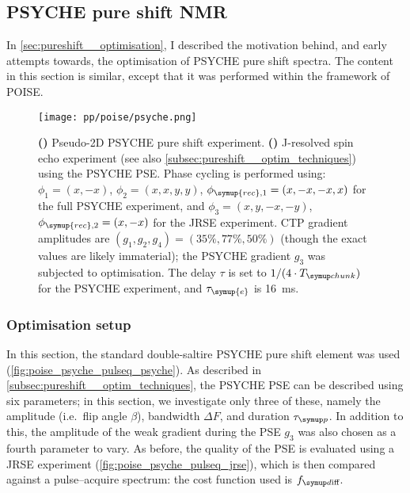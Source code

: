 \subsection{PSYCHE pure shift NMR}
\label{subsec:poise__psyche}

In \cref{sec:pureshift__optimisation}, I described the motivation behind, and early attempts towards, the optimisation of PSYCHE pure shift spectra.
The content in this section is similar, except that it was performed within the framework of POISE.

\begin{figure}[htb]
    \centering
    \texttt{[image: pp/poise/psyche.png]}%
    {\label{fig:poise_psyche_pulseq_psyche}}%
    {\label{fig:poise_psyche_pulseq_jrse}}%
    \caption[Pulse sequences used for PSYCHE optimisations]{
        \textbf{()} Pseudo-2D PSYCHE pure shift experiment.
        \textbf{()} J-resolved spin echo experiment (see also \cref{subsec:pureshift__optim_techniques}) using the PSYCHE PSE.
        Phase cycling is performed using: $\phi_1 = (x, -x)$, $\phi_2 = (x, x, y, y)$, $\phi_{\symup{rec},1} = (x, -x, -x, x)$ for the full PSYCHE experiment, and $\phi_3 = (x, y, -x, -y)$, $\phi_{\symup{rec},2} = (x, -x)$ for the JRSE experiment.
        CTP gradient amplitudes are $(g_1, g_2, g_4) = (35\%, 77\%, 50\%)$ (though the exact values are likely immaterial); the PSYCHE gradient $g_3$ was subjected to optimisation.
        The delay $\tau$ is set to $1/(4 \cdot \Tchunk)$ for the PSYCHE experiment, and $\tau_{\symup{e}}$ is \qty{16}{\ms}.
    }
    \label{fig:poise_psyche_pulseq}
\end{figure}



\subsubsection{Optimisation setup}

In this section, the standard double-saltire PSYCHE pure shift element was used (\cref{fig:poise_psyche_pulseq_psyche}).\autocite{Foroozandeh2014ACIE,Foroozandeh2018CEJ}
As described in \cref{subsec:pureshift__optim_techniques}, the PSYCHE PSE can be described using six parameters; in this section, we investigate only three of these, namely the amplitude (i.e.\ flip angle $\beta$), bandwidth $\Delta F$, and duration $\taup$.
In addition to this, the amplitude of the weak gradient during the PSE $g_3$ was also chosen as a fourth parameter to vary.
As before, the quality of the PSE is evaluated using a JRSE experiment (\cref{fig:poise_psyche_pulseq_jrse}), which is then compared against a pulse--acquire spectrum: the cost function used is $\fdiff$.

